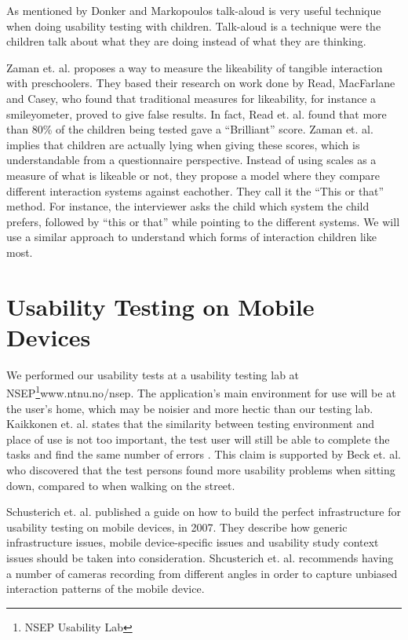 As mentioned by Donker and Markopoulos\cite{TalkAloud} talk-aloud is very useful technique when doing usability testing with children. Talk-aloud is a technique were the children talk about what they are doing instead of what they are thinking.

Zaman et. al. proposes a way to measure the likeability of tangible interaction with preschoolers\cite{zaman2007measure}. They based their research on work done by Read, MacFarlane and Casey\cite{read2002endurability}, who found that traditional measures for likeability, for instance a smileyometer, proved to give false results. In fact, Read et. al. found that more than 80\% of the children being tested gave a ``Brilliant'' score. Zaman et. al. implies that children are actually lying when giving these scores, which is understandable from a questionnaire perspective. Instead of using scales as a measure of what is likeable or not, they propose a model where they compare different interaction systems against eachother. They call it the ``This or that'' method. For instance, the interviewer asks the child which system the child prefers, followed by ``this or that'' while pointing to the different systems. We will use a similar approach to understand which forms of interaction children like most.  


\section{Usability Testing on Mobile Devices}
\label{sec:usabilitytestonmobiledevices}
We performed our usability tests at a usability testing lab at NSEP\footnote{NSEP Usability Lab}{www.ntnu.no/nsep}. The application's main environment for use will be at the user's home, which may be noisier and more hectic than our testing lab. Kaikkonen et. al. states that the similarity between testing environment and place of use is not too important, the test user will still be able to complete the tasks and find the same number of errors \cite{kallio2005usability}. This claim is supported by Beck et. al. who discovered that the test persons found more usability problems when sitting down, compared to when walking on the street\cite{beck2003experimental}. 

Schusterich et. al.\cite{schusteritsch2007towards} published a guide on how to build the perfect infrastructure for usability testing on mobile devices, in 2007. They describe how generic infrastructure issues, mobile device-specific issues and usability study context issues should be taken into consideration. Shcusterich et. al. recommends having a number of cameras recording from different angles in order to capture unbiased interaction patterns of the mobile device. 

